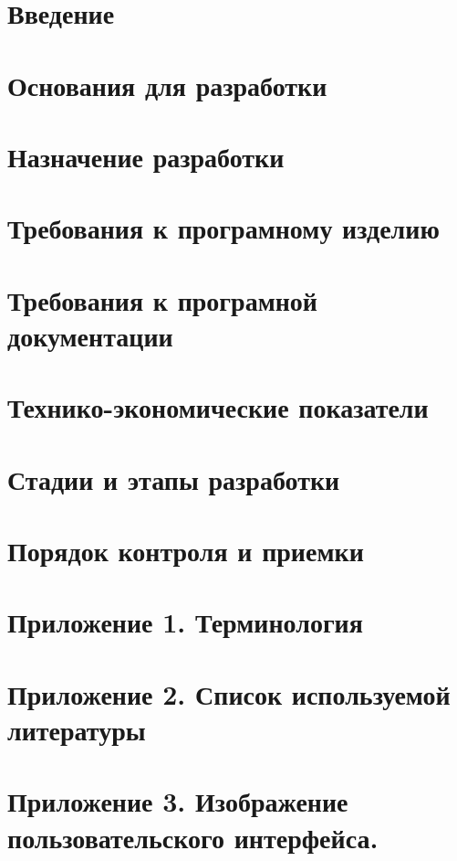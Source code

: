 \documentclass[twoside,a4paper,12pt]{article}
\begin{document}




\newpage
\tableofcontents
{}

\section{Введение}

\section{Основания для разработки}
\section{Назначение разработки}
\section{Требования к програмному изделию}
\section{Требования к програмной документации}
\section{Технико-экономические показатели}
\section{Стадии и этапы разработки}
\section{Порядок контроля и приемки}
\section{Приложение 1. Терминология}
\section{Приложение 2. Список используемой литературы}
\section{Приложение 3. Изображение пользовательского интерфейса.}

\newpage
{}
{}
\printindex
\end{document}
